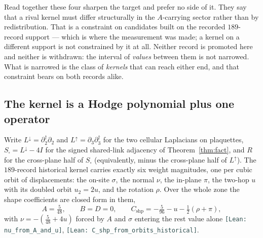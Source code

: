 \documentclass[11pt]{article}
\theoremstyle{plain}
\theoremstyle{definition}
\theoremstyle{remark}
\newcommand{\chk}[1]{}
\newcommand{\leanref}[1]{{\footnotesize\textcolor{DarkSlateGray}{\texttt{[Lean: #1]}}}}
\newcommand{\dg}{^{\dagger}}
\begin{document}
Read together these four sharpen the target and prefer no side of it. They say
that a rival kernel must differ structurally in the $A$-carrying sector rather
than by redistribution. That is a constraint on candidates built on the
recorded $189$-record support --- which is where the measurement was made; a
kernel on a different support is not constrained by it at all. Neither record is promoted here and neither is withdrawn: the interval of
\emph{values} between them is not narrowed. What is narrowed is the class of
\emph{kernels} that can reach either end, and that constraint bears on both
records alike.

\subsection{The kernel is a Hodge polynomial plus one operator}\label{sec:hodge-form}

Write $L^\downarrow=\partial_2\dg\partial_2$ and
$L^\uparrow=\partial_3\partial_3\dg$ for the two cellular Laplacians on
plaquettes, $S_\square=L^\downarrow-4I$ for the signed shared-link adjacency of
Theorem~\ref{thm:fact}, and $R$ for the cross-plane half of $S_\square$
(equivalently, minus the cross-plane half of $L^\uparrow$). The $189$-record
historical kernel carries exactly six weight magnitudes, one per cubic orbit
of displacements: the on-site $\sigma$, the normal $\nu$, the in-plane $\pi$,
the two-hop $u$ with its doubled orbit $u_2=2u$, and the rotation $\rho$. Over
the whole zone the shape coefficients are closed form in them,
\begin{equation}\label{eq:orbit-shape}
 A=\tfrac5{48},\qquad B=D=0,\qquad
 C_{\mathrm{shp}}=-\tfrac5{96}-u-\tfrac12(\rho+\pi),
\end{equation}
with $\nu=-(\tfrac5{48}+4u)$ forced by $A$ and $\sigma$ entering the rest
value alone \leanref{nu\_from\_A\_and\_u},
\leanref{C\_shp\_from\_orbits\_historical}.
\chk{the 189 records carry exactly six weight magnitudes}
\chk{the shape coefficients are solved, not fitted: A = 5/48, B = D = 0 exactly}
\chk{C\_shp = -5/96 - u - (rho + pi)/2, exactly}
\chk{A = 5/48 forces the normal amplitude: nu = -(5/48 + 4u)}
\end{document}
